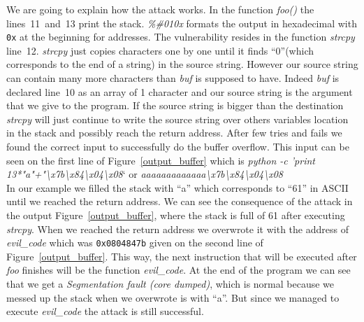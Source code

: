 \documentclass[11pt]{sdm}
\begin{document}
We are going to explain how the attack works. In the function \textit{foo()} the lines~11~and~13 print the stack. \textit{\%\#010x} formats the output in hexadecimal with \texttt{0x} at the beginning for addresses.
The vulnerability resides in the function \textit{strcpy} line~12. \textit{strcpy} just copies characters one by one until it finds ``0''(which corresponds to the end of a string) in the source string. However our source string can contain many more characters than \textit{buf} is supposed to have. 
Indeed \textit{buf} is declared line~10 as an array of 1 character and our source string is the argument that we give to the program.
If the source string is bigger than the destination \textit{strcpy} will just continue to write the source string over others variables location in the stack and possibly reach the return address.
After few tries and fails we found the correct input to successfully do the buffer overflow. This input can be seen on the first line of Figure~\ref{output_buffer} which is \textit{python -c 'print 13*"a"+"\textbackslash{x7b}\textbackslash{x84}\textbackslash{x04}\textbackslash{x08}}` or \textit{aaaaaaaaaaaaa\textbackslash{x7b}\textbackslash{x84}\textbackslash{x04}\textbackslash{x08}}\\
In our example we filled the stack with ``a'' which corresponds to ``61'' in ASCII until we reached the return address.
We can see the consequence of the attack in the output Figure~\ref{output_buffer}, where the stack is full of 61 after executing \textit{strcpy}.
When we reached the return address we overwrote it with the address of \textit{evil\_code} which was \texttt{0x0804847b} given on the second line of Figure~\ref{output_buffer}.
This way, the next instruction that will be executed after \textit{foo} finishes will be the function \textit{evil\_code}.
At the end of the program we can see that we get a \textit{Segmentation fault (core dumped)}, which is normal because we messed up the stack when we overwrote is with ``a''. But since we managed to execute \textit{evil\_code} the attack is still successful.
\end{document}
